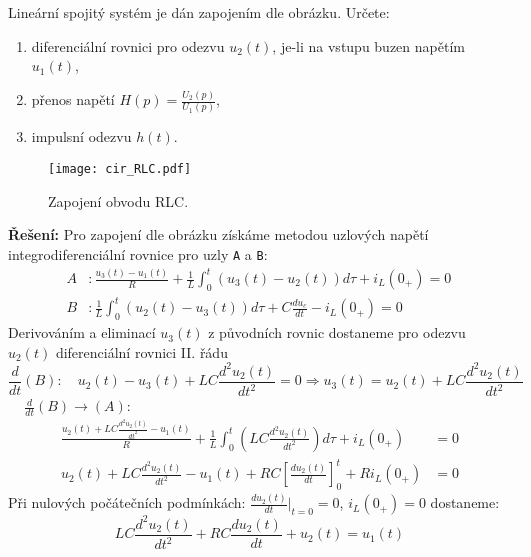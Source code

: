 \begin{example}Lineární spojitý systém je dán zapojením dle obrázku. Určete:
    \begin{enumerate}
       \item diferenciální rovnici pro odezvu $u_2(t)$, je-li na vstupu buzen napětím $u_1(t)$,
       \item přenos napětí $H(p)=\frac{U_2(p)}{U_1(p)}$,
       \item impulsní odezvu $h(t)$.
    \end{enumerate}
    \begin{figure}[ht!]
       \centering
       \texttt{[image: cir\_RLC.pdf]}
       \caption{Zapojení obvodu RLC.}\label{SAS:fig_RLC}
    \end{figure}
    \textbf{Řešení:}\newline
    Pro zapojení dle obrázku získáme metodou uzlových napětí integrodiferenciální rov\-ni\-ce pro
    uzly \texttt{A} a \texttt{B}:
    \begin{align}\label{SAS:eq_RLC_basic_rces}
        A &:  \frac{u_3(t)-u_1(t)}{R}+\frac{1}{L}\int_0^t{(u_3(t)-u_2(t))}d\tau+i_L(0_+) = 0\, \\ \nonumber
        B &:  \frac{1}{L}\int_0^t{(u_2(t)-u_3(t))}d\tau+C\frac{du_c}{dt}-i_L(0_+)        = 0
    \end{align}
    Derivováním a eliminací $u_3(t)$ z původních rovnic dostaneme pro odezvu $u_2(t)$ diferenciální
    rovnici II. řádu
    \begin{equation*}
       \frac{d}{dt}(B):\quad u_2(t)-u_3(t)+LC\frac{d^2u_2(t)}{dt^2}
              =0\Rightarrow u_3(t)=u_2 (t)+LC\frac{d^2u_2(t)}{dt^2}
    \end{equation*}
    $\quad\,\frac{d}{dt}(B)\rightarrow(A)$:
    \begin{align*}
       \frac{u_2(t)+LC\frac{d^2u_2(t)}{dt^2}-u_1(t)}{R}+
       \frac{1}{L}\int_0^t{(LC\frac{d^2u_2(t)}{dt^2})}d\tau+i_L(0_+) &=  0            \\
        u_2(t)+LC\frac{d^2u_2(t)}{dt^2}-u_1(t)+
        RC\left[\frac{du_2(t)}{dt}\right]_0^t+Ri_L(0_+)              &=  0
    \end{align*}
    Při nulových počátečních podmínkách: $\frac{du_2(t)}{dt}|_{t=0}=0$, $i_L(0_+)=0$ dostaneme:
    \begin{equation}\label{sas:eq_dif_RLC_II_r}
       LC\frac{d^2u_2(t)}{dt^2}+RC\frac{du_2(t)}{dt}+u_2(t)=u_1(t)

\end{equation}
\end{example}
